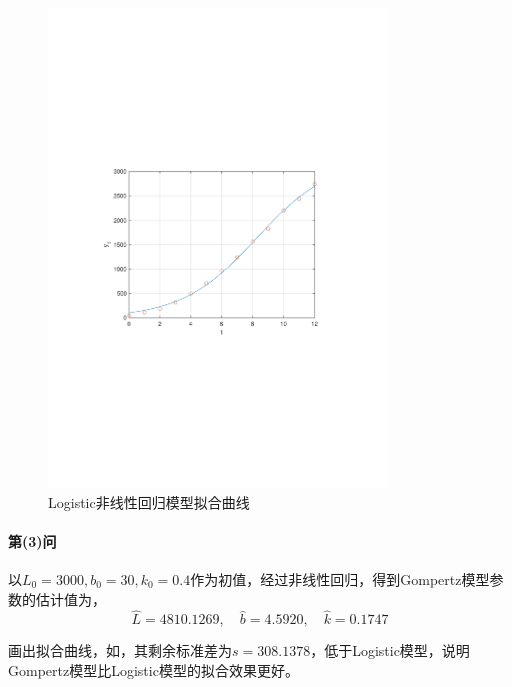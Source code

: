 \begin{figure}[H]
    \centering
    \includegraphics[width=0.8\textwidth,trim={3.09cm 9.295cm 3.09cm 9.295cm},clip]{fig/ex13_logistic_nonlinear.pdf}
    \caption{Logistic非线性回归模型拟合曲线}
    \label{fig:ex13_logistic_nonlinear}
\end{figure}

\paragraph{第(3)问} 以$L_0=3000, b_0=30, k_0=0.4$作为初值，经过非线性回归，得到Gompertz模型参数的估计值为，
\begin{equation}
    \hat{L} = 4810.1269, \quad \hat{b} = 4.5920, \quad \hat{k} = 0.1747
\end{equation}

画出拟合曲线，如，其剩余标准差为$s=308.1378$，低于Logistic模型，说明Gompertz模型比Logistic模型的拟合效果更好。

